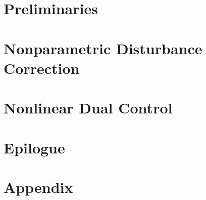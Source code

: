 \documentclass[
                twoside,
                openright, %
                titlepage,
                numbers=noenddot,
                a4paper,
                paper=a4,
                fontsize=11pt,
                ]{scrreprt}
\begin{document}


\cleardoublepage
{}
\part{Preliminaries}\label{par:prelimininaries}





\cleardoublepage
{}
\part{Nonparametric Disturbance Correction}
\label{par:predictive-disturbance-control}





\cleardoublepage
{}
\part{Nonlinear Dual Control}\label{par:dual-control}





\cleardoublepage
{}
\part*{Epilogue}




\appendix
\cleardoublepage
{}
\part*{Appendix}




\cleardoublepage
\cleardoublepage
\cleardoublepage

\end{document}
